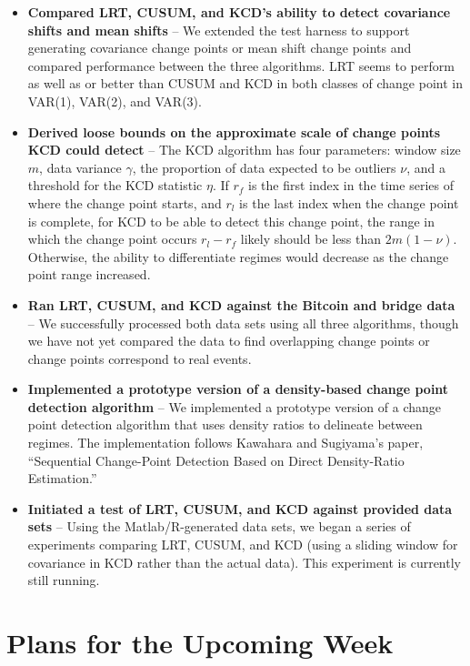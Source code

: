 \documentclass[10pt,letterpaper]{article}
\begin{document}
\begin{itemize}
\item \textbf{Compared LRT, CUSUM, and KCD's ability to detect covariance shifts and mean shifts} -- We extended the test harness to support generating covariance change points or mean shift change points and compared performance between the three algorithms. LRT seems to perform as well as or better than CUSUM and KCD in both classes of change point in VAR(1), VAR(2), and VAR(3).

\item \textbf{Derived loose bounds on the approximate scale of change points KCD could detect} -- The KCD algorithm has four parameters: window size $m$, data variance $\gamma$, the proportion of data expected to be outliers $\nu$, and a threshold for the KCD statistic $\eta$. If $r_f$ is the first index in the time series of where the change point starts, and $r_l$ is the last index when the change point is complete, for KCD to be able to detect this change point, the range in which the change point occurs $r_l - r_f$ likely should be less than $2m(1-\nu)$. Otherwise, the ability to differentiate regimes would decrease as the change point range increased.

\item \textbf{Ran LRT, CUSUM, and KCD against the Bitcoin and bridge data} -- We successfully processed both data sets using all three algorithms, though we have not yet compared the data to find overlapping change points or change points correspond to real events.

\item \textbf{Implemented a prototype version of a density-based change point detection algorithm} -- We implemented a prototype version of a change point detection algorithm that uses density ratios to delineate between regimes. The implementation follows Kawahara and Sugiyama's paper, ``Sequential Change-Point Detection Based on Direct Density-Ratio Estimation.''

\item \textbf{Initiated a test of LRT, CUSUM, and KCD against provided data sets} -- Using the Matlab/R-generated data sets, we began a series of experiments comparing LRT, CUSUM, and KCD (using a sliding window for covariance in KCD rather than the actual data). This experiment is currently still running.

\end{itemize}

\section{Plans for the Upcoming Week}
\end{document}
